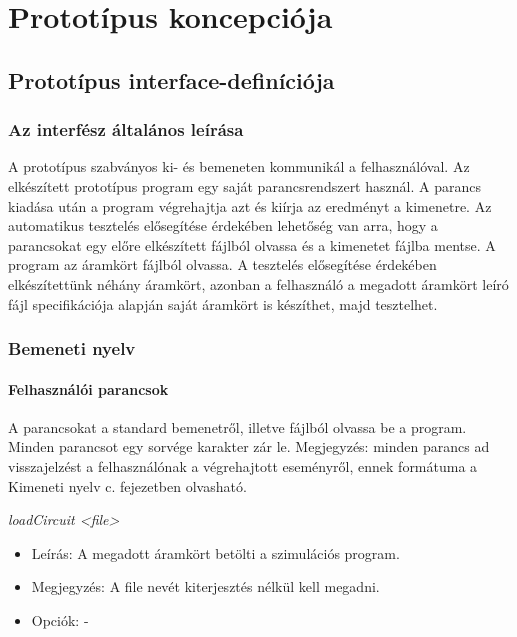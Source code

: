 %
\chapter{Prototípus koncepciója}

\parindent 0pt
\setcounter{secnumdepth}{3}
\setcounter{tocdepth}{3}
\thispagestyle{fancy}

\section{Prototípus interface-definíciója}

\subsection{Az interfész általános leírása}
A prototípus szabványos ki- és bemeneten kommunikál a felhasználóval. Az elkészített prototípus program egy
saját parancsrendszert használ. A parancs kiadása után a program végrehajtja azt és kiírja az eredményt a kimenetre. Az automatikus tesztelés elősegítése érdekében lehetőség van arra, hogy 
a parancsokat egy előre elkészített fájlból olvassa és a kimenetet fájlba mentse. A program az áramkört
fájlból olvassa. A tesztelés elősegítése érdekében elkészítettünk néhány áramkört, azonban a felhasználó a megadott áramkört leíró fájl specifikációja alapján saját áramkört is készíthet, majd tesztelhet. 


\subsection{Bemeneti nyelv}

\subsubsection{Felhasználói parancsok}

A parancsokat a standard bemenetről, illetve fájlból olvassa be a program. Minden parancsot egy sorvége karakter zár le.\newline
Megjegyzés: minden parancs ad visszajelzést a felhasználónak a végrehajtott eseményről, ennek formátuma a Kimeneti nyelv c. fejezetben olvasható.\newline

\textit{loadCircuit <file>}
\begin{itemize}
	\item Leírás: A megadott áramkört betölti a szimulációs program.
	\item Megjegyzés: A file nevét kiterjesztés nélkül kell megadni.
	\item Opciók: -
\end{itemize}

